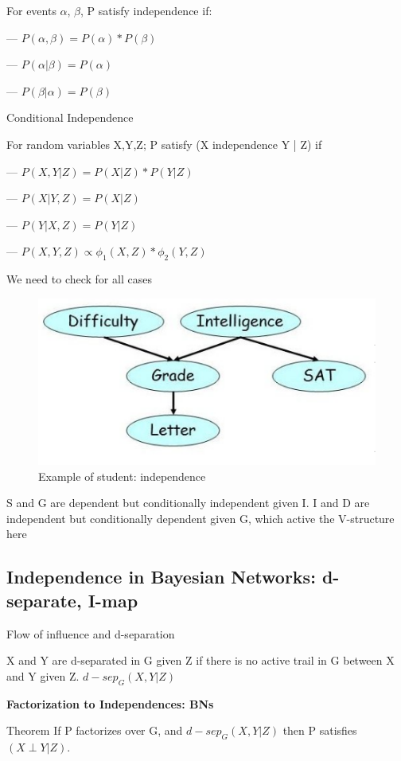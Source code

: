 \documentclass{book}
\begin{document}
For events $\alpha$, $\beta$, P satisfy independence if:

--- $P(\alpha,\beta) = P(\alpha) * P(\beta)$

--- $P(\alpha|\beta) = P(\alpha)$ 

--- $P(\beta|\alpha) = P(\beta)$

Conditional Independence

For random variables X,Y,Z; P satisfy (X independence Y | Z) if

--- $P(X,Y | Z) = P(X|Z) * P(Y|Z)$

--- $P(X|Y,Z) = P(X|Z)$

--- $P(Y|X,Z) = P(Y|Z)$

--- $P(X,Y,Z) \propto \phi_1(X,Z) * \phi_2(Y,Z)$

We need to check for all cases

\begin{figure}[h]
\centering
\includegraphics[width=0.7\linewidth, height=0.1\textheight]{./figures/independence}
\caption{Example of student: independence}
\label{fig:independence}
\end{figure}

S and G are dependent but conditionally independent given I. I and D are independent but conditionally dependent given G, which active the V-structure here



\subsection{Independence in Bayesian Networks: d-separate, I-map}

Flow of influence and d-separation

X and Y are d-separated in G given Z if there is no active trail in G between X and Y given Z. $d-sep_G(X,Y|Z)$

\textbf{Factorization to Independences: BNs}

Theorem If P factorizes over G, and $d-sep_G(X,Y|Z)$ then P satisfies $(X\perp Y|Z)$.
\end{document}
